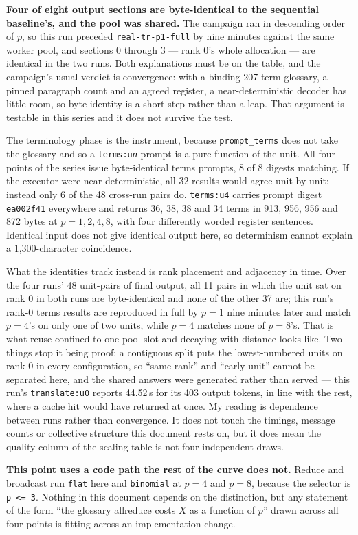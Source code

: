 \documentclass[11pt]{article}
\begin{document}
\textbf{Four of eight output sections are byte-identical to the sequential baseline's, and the
pool was shared.} The campaign ran in descending order of $p$, so this run preceded
\texttt{real-tr-p1-full} by nine minutes against the same worker pool, and sections 0 through 3
--- rank 0's whole allocation --- are identical in the two runs. Both explanations must be on the
table, and the campaign's usual verdict is convergence: with a binding 207-term glossary, a pinned
paragraph count and an agreed register, a near-deterministic decoder has little room, so
byte-identity is a short step rather than a leap. That argument is testable in this series and it
does not survive the test.

The terminology phase is the instrument, because \texttt{prompt\_terms} does not take the glossary
and so a \texttt{terms:u\emph{n}} prompt is a pure function of the unit. All four points of the
series issue byte-identical terms prompts, 8 of 8 digests matching. If the executor were
near-deterministic, all 32 results would agree unit by unit; instead only 6 of the 48 cross-run
pairs do. \texttt{terms:u4} carries prompt digest \texttt{ea002f41} everywhere and returns 36, 38,
38 and 34 terms in 913, 956, 956 and 872 bytes at $p=1,2,4,8$, with four differently worded
register sentences. Identical input does not give identical output here, so determinism cannot
explain a 1{,}300-character coincidence.

What the identities track instead is rank placement and adjacency in time. Over the four runs'
48 unit-pairs of final output, all 11 pairs in which the unit sat on rank 0 in both runs are
byte-identical and none of the other 37 are; this run's rank-0 terms results are reproduced in
full by $p=1$ nine minutes later and match $p=4$'s on only one of two units, while $p=4$ matches
none of $p=8$'s. That is what reuse confined to one pool slot and decaying with distance looks
like. Two things stop it being proof: a contiguous split puts the lowest-numbered units on rank 0
in every configuration, so ``same rank'' and ``early unit'' cannot be separated here, and the
shared answers were generated rather than served --- this run's \texttt{translate:u0} reports
44.52\,s for its 403 output tokens, in line with the rest, where a cache hit would have returned
at once. My reading is dependence between runs
rather than convergence. It does not touch the timings, message counts or collective structure
this document rests on, but it does mean the quality column of the scaling table is not four
independent draws.

\textbf{This point uses a code path the rest of the curve does not.} Reduce and broadcast run
\texttt{flat} here and \texttt{binomial} at $p=4$ and $p=8$, because the selector is \texttt{p <=
3}. Nothing in this document depends on the distinction, but any statement of the form ``the
glossary allreduce costs $X$ as a function of $p$'' drawn across all four points is fitting across
an implementation change.
\end{document}
